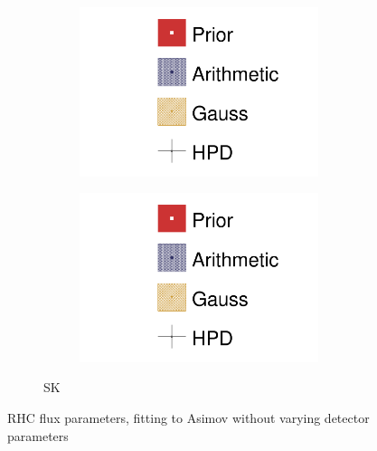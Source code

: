 \begin{figure}[h]
\begin{subfigure}[t]{\textwidth}
\begin{subfigure}[t]{0.24\textwidth}
		\includegraphics[width=\textwidth,page=16, trim={0mm 0mm 0mm 9mm}, clip]{figures/mach3/2018/asimov/2018a_MultiPi_Binningv6_NewCov_Asimov_NoDet_merge_drawPar}
	\end{subfigure}
	\begin{subfigure}[t]{0.24\textwidth}
		\includegraphics[width=\textwidth,page=17, trim={0mm 0mm 0mm 9mm}, clip]{figures/mach3/2018/asimov/2018a_MultiPi_Binningv6_NewCov_Asimov_NoDet_merge_drawPar}
	\end{subfigure}
\caption{SK}
\end{subfigure}
	\caption{RHC flux parameters, fitting to Asimov without varying detector parameters}
	\label{fig:asimov_fit_2018_nodet_rhc}
\end{figure}

